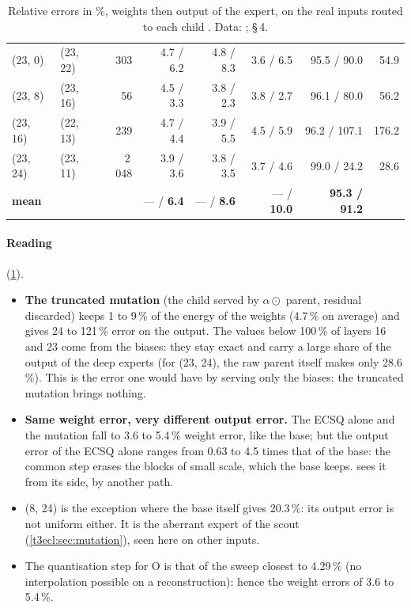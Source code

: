 \begin{table}[tbp]
\begin{tabular}{l l r r r r r r}
(23, 0) & (23, 22) & 303 & 4.7 / 6.2 & 4.8 / 8.3 & 3.6 / 6.5 & 95.5 / 90.0 & 54.9 \\
(23, 8) & (23, 16) & 56 & 4.5 / 3.3 & 3.8 / 2.3 & 3.8 / 2.7 & 96.1 / 80.0 & 56.2 \\
(23, 16) & (22, 13) & 239 & 4.7 / 4.4 & 3.9 / 5.5 & 4.5 / 5.9 & 96.2 / 107.1 & 176.2 \\
(23, 24) & (23, 11) & 2\,048 & 3.9 / 3.6 & 3.8 / 3.5 & 3.7 / 4.6 & 99.0 / 24.2 & 28.6 \\
\midrule
\textbf{mean} & & & --- / \textbf{6.4} & --- / \textbf{8.6} & --- / \textbf{10.0} & \textbf{95.3 / 91.2} & \\
\bottomrule
\end{tabular}
\caption[The output of the children, on real inputs]{Relative errors in \%, weights then output of the expert, on the real inputs routed to each child \mes. Data: ;  §\,4.}
\label{t3dup:tab:sortie}
\end{table}

\paragraph{Reading} (\cref{t3dup:tab:sortie}).
\begin{itemize}
\item \textbf{The truncated mutation} (the child served by $\alpha \odot$ parent, residual discarded) keeps 1 to 9\,\% of the energy of the weights (4.7\,\% on average) and gives 24 to 121\,\% error on the output. The values below 100\,\% of layers 16 and 23 come from the biases: they stay exact and carry a large share of the output of the deep experts (for (23, 24), the raw parent itself makes only 28.6\,\%). This is the error one would have by serving only the biases: the truncated mutation brings nothing.
\item \textbf{Same weight error, very different output error.} The ECSQ alone and the mutation fall to 3.6 to 5.4\,\% weight error, like the base; but the output error of the ECSQ alone ranges from 0.63 to 4.5 times that of the base: the common step erases the blocks of small scale, which the base keeps.  sees it from its side, by another path.
\item (8, 24) is the exception where the base itself gives 20.3\,\%: its output error is not uniform either. It is the aberrant expert of the scout (\cref{t3ecl:sec:mutation}), seen here on other inputs.
\item The quantisation step for O is that of the sweep closest to 4.29\,\% (no interpolation possible on a reconstruction): hence the weight errors of 3.6 to 5.4\,\%.
\end{itemize}

